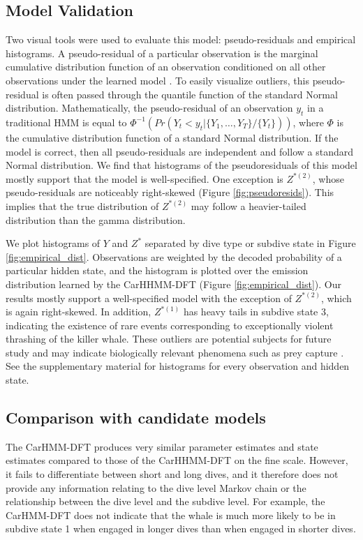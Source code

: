 \subsection{Model Validation}
\label{subsec:model_validation}

Two visual tools were used to evaluate this model: pseudo-residuals and empirical histograms. A pseudo-residual of a particular observation is the marginal cumulative distribution function of an observation conditioned on all other observations under the learned model \citep{Zucchini:2016}. To easily visualize outliers, this pseudo-residual is often passed through the quantile function of the standard Normal distribution. Mathematically, the pseudo-residual of an observation $y_t$ in a traditional HMM is equal to $\Phi^{-1} \left(Pr(Y_t < y_t|\{Y_1,\ldots,Y_T\}/\{Y_t\}) \right)$, where $\Phi$ is the cumulative distribution function of a standard Normal distribution. If the model is correct, then all pseudo-residuals are independent and follow a standard Normal distribution. We find that histograms of the pseudoresiduals of this model mostly support that the model is well-specified. One exception is $Z^{*(2)}$, whose pseudo-residuals are noticeably right-skewed (Figure \ref{fig:pseudoresids}). This implies that the true distribution of $Z^{*(2)}$ may follow a heavier-tailed distribution than the gamma distribution. 

We plot histograms of $Y$ and $Z^*$ separated by dive type or subdive state in Figure \ref{fig:empirical_dist}. Observations are weighted by the decoded probability of a particular hidden state, and the histogram is plotted over the emission distribution learned by the CarHHMM-DFT (Figure \ref{fig:empirical_dist}). Our results mostly support a well-specified model with the exception of $Z^{*(2)}$, which is again right-skewed. In addition, $Z^{*(1)}$ has heavy tails in subdive state 3, indicating the existence of rare events corresponding to exceptionally violent thrashing of the killer whale. These outliers are potential subjects for future study and may indicate biologically relevant phenomena such as prey capture \cite{Tennessen:2019a}. See the supplementary material for histograms for every observation and hidden state. 

\subsection{Comparison with candidate models}

The CarHMM-DFT produces very similar parameter estimates and state estimates compared to those of the CarHHMM-DFT on the fine scale. However, it fails to differentiate between short and long dives, and it therefore does not provide any information relating to the dive level Markov chain or the relationship between the dive level and the subdive level. For example, the CarHMM-DFT does not indicate that the whale is much more likely to be in subdive state 1 when engaged in longer dives than when engaged in shorter dives.

